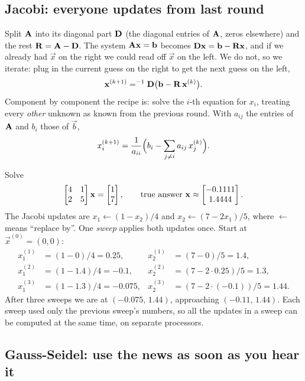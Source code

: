 \subsection{Jacobi: everyone updates from last round}

Split $\mathbf{A}$ into its diagonal part $\mathbf{D}$ (the diagonal entries of $\mathbf{A}$,
zeros elsewhere) and the rest $\mathbf{R}=\mathbf{A}-\mathbf{D}$.
The system $\mathbf{A}\mathbf{x}=\mathbf{b}$ becomes $\mathbf{D}\mathbf{x} = \mathbf{b}-\mathbf{R}\mathbf{x}$,
and if we already had $\vec{x}$ on the right we could read off $\vec{x}$ on the left.
We do not, so we iterate: plug in the current guess on the right to get the next guess
on the left,
\[
  \mathbf{x}^{(k+1)} = ^{-1}{\mathbf{D}}\bigl(\mathbf{b} - \mathbf{R}\,\mathbf{x}^{(k)}\bigr).
\]
Component by component the recipe is: solve the $i$-th equation for $x_i$, treating
every \emph{other} unknown as known from the previous round. With $a_{ij}$ the entries
of $\mathbf{A}$ and $b_i$ those of $\vec{b}$,
\[
  x_i^{(k+1)} = \frac{1}{a_{ii}}\Bigl(b_i - \sum_{j\ne i} a_{ij}\,x_j^{(k)}\Bigr).
\]

\begin{example}
\label{ch33:jacobi}
Solve
\[
  \begin{bmatrix} 4 & 1 \\ 2 & 5 \end{bmatrix}\mathbf{x} = \begin{bmatrix}1\\7\end{bmatrix},
  \qquad\text{true answer } \mathbf{x}\approx\begin{bmatrix}-0.1111 \\ 1.4444\end{bmatrix}.
\]
The Jacobi updates are $x_1 \leftarrow (1 - x_2)/4$ and $x_2 \leftarrow (7-2x_1)/5$,
where $\leftarrow$ means ``replace by''. One \emph{sweep} applies both updates once.
Start at $\vec{x}^{(0)}=(0,0)$:
\[
  \begin{aligned}
  x_1^{(1)} &= (1-0)/4 = 0.25, & x_2^{(1)} &= (7-0)/5 = 1.4,\\
  x_1^{(2)} &= (1-1.4)/4 = -0.1, & x_2^{(2)} &= (7-2\cdot 0.25)/5 = 1.3,\\
  x_1^{(3)} &= (1-1.3)/4 = -0.075, & x_2^{(3)} &= (7-2\cdot(-0.1))/5 = 1.44.
  \end{aligned}
\]
After three sweeps we are at $(-0.075,\,1.44)$, approaching $(-0.11,\,1.44)$. Each
sweep used only the previous sweep's numbers, so all the updates in a sweep can be
computed at the same time, on separate processors.
\end{example}

\subsection{Gauss-Seidel: use the news as soon as you hear it}

